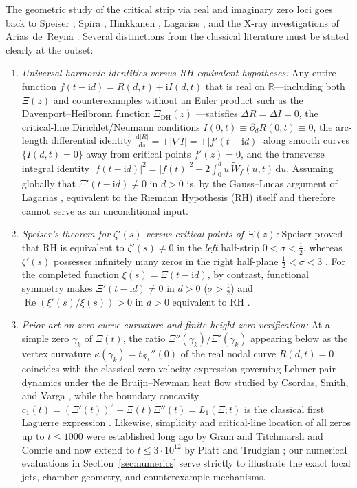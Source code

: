 \documentclass[11pt,a4paper,reqno]{amsart}
\theoremstyle{definition}
\theoremstyle{remark}
\numberwithin{equation}{section}
\newcommand{\dd}{\mathrm{d}}
\newcommand{\ii}{\mathrm{i}}
\newcommand{\Rea}{\operatorname{Re}}
\newcommand{\Wtil}{\widetilde{W}}
\begin{document}
The geometric study of the critical strip via real and imaginary zero loci goes back to Speiser \cite{Speiser1934}, Spira \cite{Spira1965,Spira1968,Spira1973}, Hinkkanen \cite{Hinkkanen1997}, Lagarias \cite{Lagarias1999}, and the X-ray investigations of Arias~de~Reyna \cite{AriasDeReyna2003}. Several distinctions from the classical literature must be stated clearly at the outset:
\begin{enumerate}
\item \emph{Universal harmonic identities versus RH-equivalent hypotheses:} Any entire function $f(t-\ii d) = R(d,t) + \ii I(d,t)$ that is real on $\mathbb{R}$---including both $\Xi(z)$ and counterexamples without an Euler product such as the Davenport--Heilbronn function $\Xi_{\mathrm{DH}}(z)$ \cite{DavenportHeilbronn1936}---satisfies $\Delta R = \Delta I = 0$, the critical-line Dirichlet/Neumann conditions $I(0,t) \equiv \partial_d R(0,t) \equiv 0$, the arc-length differential identity $\frac{\dd|R|}{\dd s} = \pm|\nabla I| = \pm|f'(t-\ii d)|$ along smooth curves $\{I(d,t)=0\}$ away from critical points $f'(z) = 0$, and the transverse integral identity $|f(t-\ii d)|^2 = |f(t)|^2 + 2\int_0^d u\,\Wtil_f(u,t)\,\dd u$. Assuming globally that $\Xi'(t-\ii d) \neq 0$ in $d > 0$ is, by the Gauss--Lucas argument of Lagarias \cite{Lagarias1999}, equivalent to the Riemann Hypothesis (RH) itself and therefore cannot serve as an unconditional input.
\item \emph{Speiser's theorem for $\zeta'(s)$ versus critical points of $\Xi(z)$:} Speiser \cite{Speiser1934} proved that RH is equivalent to $\zeta'(s) \neq 0$ in the \emph{left} half-strip $0 < \sigma < \frac{1}{2}$, whereas $\zeta'(s)$ possesses infinitely many zeros in the right half-plane $\frac{1}{2} < \sigma < 3$ \cite{Spira1965,Spira1968,Spira1973}. For the completed function $\xi(s) = \Xi(t-\ii d)$, by contrast, functional symmetry makes $\Xi'(t-\ii d) \neq 0$ in $d > 0$ ($\sigma > \frac{1}{2}$) and $\Rea(\xi'(s)/\xi(s)) > 0$ in $d > 0$ equivalent to RH \cite{Hinkkanen1997,Lagarias1999}.
\item \emph{Prior art on zero-curve curvature and finite-height zero verification:} At a simple zero $\gamma_k$ of $\Xi(t)$, the ratio $\Xi''(\gamma_k)/\Xi'(\gamma_k)$ appearing below as the vertex curvature $\kappa(\gamma_k) = t_{\mathcal{R}_k}''(0)$ of the real nodal curve $R(d,t) = 0$ coincides with the classical zero-velocity expression governing Lehmer-pair dynamics under the de Bruijn--Newman heat flow studied by Csordas, Smith, and Varga \cite{CsordasSmithVarga1994}, while the boundary concavity $c_1(t) = (\Xi'(t))^2 - \Xi(t)\Xi''(t) = L_1(\Xi;t)$ is the classical first Laguerre expression \cite{Jensen1913,CsordasVarga1990}. Likewise, simplicity and critical-line location of all zeros up to $t \le 1000$ were established long ago by Gram \cite{Gram1903} and Titchmarsh and Comrie \cite{TitchmarshComrie1936} and now extend to $t \le 3 \cdot 10^{12}$ by Platt and Trudgian \cite{PlattTrudgian2021}; our numerical evaluations in Section~\ref{sec:numerics} serve strictly to illustrate the exact local jets, chamber geometry, and counterexample mechanisms.
\end{enumerate}
\end{document}
